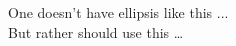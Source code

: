 \documentclass{article}
\begin{document}
One doesn't have ellipsis like this ...\\
But rather should use this \ldots
\end{document}
